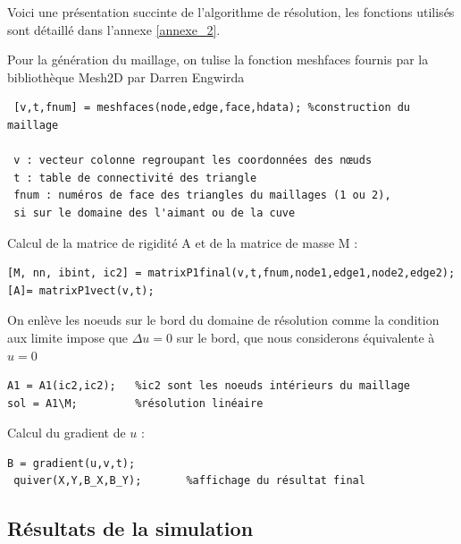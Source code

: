 \documentclass[a4paper,12pt,titlepage]{report}
\begin{document}
\begin{onehalfspace}
Voici une présentation succinte de l'algorithme de résolution, les fonctions utilisés sont détaillé dans l'annexe \ref{annexe_2}.

Pour la génération du maillage, on tulise la fonction meshfaces fournis par la bibliothèque Mesh2D par Darren Engwirda
\begin{verbatim}
 [v,t,fnum] = meshfaces(node,edge,face,hdata); %construction du maillage
 
 v : vecteur colonne regroupant les coordonnées des nœuds
 t : table de connectivité des triangle
 fnum : numéros de face des triangles du maillages (1 ou 2), 
 si sur le domaine des l'aimant ou de la cuve
\end{verbatim}
Calcul de la matrice de rigidité A et de la matrice de masse M : 
\begin{verbatim}
[M, nn, ibint, ic2] = matrixP1final(v,t,fnum,node1,edge1,node2,edge2);
[A]= matrixP1vect(v,t);
\end{verbatim}

On enlève les noeuds sur le bord du domaine de résolution comme la condition aux limite impose que $\Delta u = 0$ sur le bord, que nous considerons équivalente à $u = 0$ 
\begin{verbatim}
A1 = A1(ic2,ic2);	%ic2 sont les noeuds intérieurs du maillage
sol = A1\M;			%résolution linéaire
\end{verbatim}
Calcul du gradient de $u$ :
\begin{verbatim}
B = gradient(u,v,t);
 quiver(X,Y,B_X,B_Y);		%affichage du résultat final
\end{verbatim}

 
\subsection{Résultats de la simulation}


\end{onehalfspace}
\end{document}
